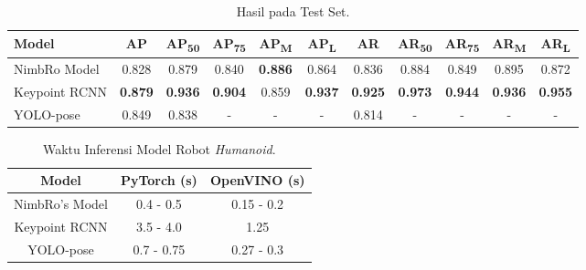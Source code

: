 \begin{longtable}{|L{1.5cm}|c|c|c|c|c|c|c|c|c|c|}
  \caption{Hasil pada Test Set.}
  \label{tb:result-on-test-set}\\
  \hline
  \textbf{Model} & \textbf{AP} & \textbf{AP\textsubscript{50}} & \textbf{AP\textsubscript{75}} & \textbf{AP\textsubscript{M}} & \textbf{AP\textsubscript{L}} & \textbf{AR} & \textbf{AR\textsubscript{50}} & \textbf{AR\textsubscript{75}} & \textbf{AR\textsubscript{M}} & \textbf{AR\textsubscript{L}} \\
  \hline
  NimbRo Model & 0.828       & 0.879                         & 0.840                         & \textbf{0.886}                       & 0.864                        & 0.836       & 0.884                         & 0.849                         & 0.895                        & 0.872 \\
  \hline                        
  Keypoint RCNN  & \textbf{0.879}       & \textbf{0.936}                         & \textbf{0.904}                         & 0.859                        & \textbf{0.937}                       & \textbf{0.925}       & \textbf{0.973}                         & \textbf{0.944}                         & \textbf{0.936}                        & \textbf{0.955} \\
  \hline                        
  YOLO-pose      & 0.849       & 0.838                         & -                             & -                            & -                            & 0.814       & -                             & -                             & -                            & - \\
  \hline
\end{longtable}

\def\arraystretch{1.5}
\begin{longtable}{|c|c|c|}
  \caption{Waktu Inferensi Model Robot \textit{Humanoid}.}
  \label{tb:inferencerobot}\\
  \hline
  \rowcolor[HTML]{C0C0C0}
  \textbf{Model}    & \textbf{PyTorch (s)} & \textbf{OpenVINO (s)}\\
  \hline
  NimbRo's Model & 0.4 - 0.5 & 0.15 - 0.2 \\
  \hline
  Keypoint RCNN  & 3.5 - 4.0 & 1.25 \\
  \hline
  YOLO-pose      & 0.7 - 0.75& 0.27 - 0.3 \\
  \hline
\end{longtable}

